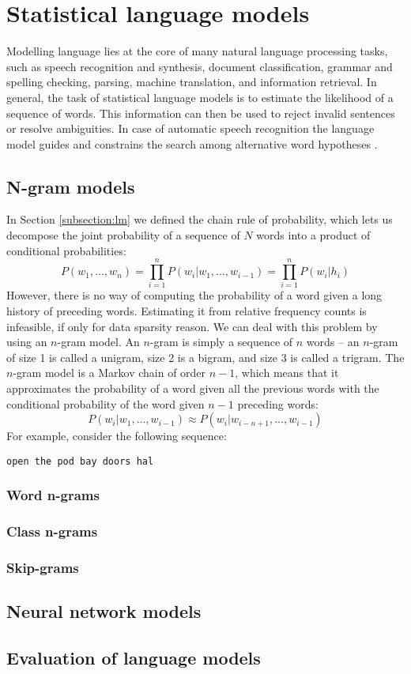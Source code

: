\chapter{Statistical language models}
\label{chapter:lm}
Modelling language lies at the core of many natural language processing tasks, such as speech recognition and synthesis, document classification, grammar and spelling checking, parsing, machine translation, and information retrieval. In general, the task of statistical language models is to estimate the likelihood of a sequence of words. This information can then be used to reject invalid sentences or resolve ambiguities. In case of automatic speech recognition the language model guides and constrains the search among alternative word hypotheses \cite{glass2013automatic}.

\section{N-gram models}
In Section \ref{subsection:lm} we defined the chain rule of probability, which lets us decompose the joint probability of a sequence of $N$ words into a product of conditional probabilities:
\begin{equation}
	P(w_{1}, \dots, w_{n})=\prod_{i=1}^{n}P(w_{i}|w_{1},\dots,w_{i-1})=\prod_{i=1}^{n}P(w_{i}|h_{i})
\end{equation}
However, there is no way of computing the probability of a word given a long history of preceding words. Estimating it from relative frequency counts is infeasible, if only for data sparsity reason. We can deal with this problem by using an $n$-gram model. An $n$-gram is simply a sequence of $n$ words -- an $n$-gram of size 1 is called a unigram, size 2 is a bigram, and size 3 is called a trigram. The $n$-gram model is a Markov chain of order $n-1$, which means that it approximates the probability of a word given all the previous words with the conditional probability of the word given $n-1$ preceding words:
\begin{equation}
	P(w_{i}|w_{1},\dots,w_{i-1})\approx P(w_{i}|w_{i-n+1},\dots,w_{i-1})
\end{equation}
For example, consider the following sequence:
\begin{center}
\texttt{open the pod bay doors hal}  
\end{center}
\subsection{Word n-grams}

\subsection{Class n-grams}
\label{subsection:class}
\subsection{Skip-grams}

\section{Neural network models}

\section{Evaluation of language models}
\label{section:evaluation}


